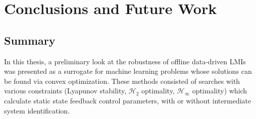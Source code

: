 \chapter{Conclusions and Future Work}
\label{chap:conclusion}
\section{Summary}
In this thesis, a preliminary look at the robustness of offline data-driven LMIs was presented as a surrogate for machine learning problems whose solutions can be found via convex optimization.  These methods consisted of searches with various constraints (Lyapunov stability, $\mathcal{H}_{2}$ optimality, $\mathcal{H}_{\infty}$ optimality) which calculate static state feedback control parameters, with or without intermediate system identification.


